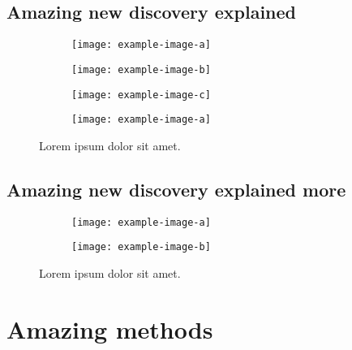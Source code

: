 \documentclass[10pt,a4paper]{article}
\begin{document}
\subsection{Amazing new discovery explained}
\label{sec:new_discovery_explained}
% 
\lipsum[7]

\begin{figure}[htb]
    \centering
    \begin{subfigure}{0.24\textwidth}
        \centering
        \texttt{[image: example-image-a]}
    \end{subfigure}
    \begin{subfigure}{0.24\textwidth}
        \centering
        \texttt{[image: example-image-b]}
    \end{subfigure}
    \begin{subfigure}{0.24\textwidth}
        \centering
        \texttt{[image: example-image-c]}
    \end{subfigure}
    \begin{subfigure}{0.24\textwidth}
        \centering
        \texttt{[image: example-image-a]}
    \end{subfigure}
    \caption{
        Lorem ipsum dolor sit amet.
    }
\end{figure}


\subsection{Amazing new discovery explained more}
\label{sec:new_discovery_explained_more}
% 

\begin{figure}[htb]
    \centering
    \begin{subfigure}{0.3\textwidth}
        \centering
        \texttt{[image: example-image-a]}
    \end{subfigure}
    \begin{subfigure}{0.3\textwidth}
        \centering
        \texttt{[image: example-image-b]}
    \end{subfigure}
    \caption{
        Lorem ipsum dolor sit amet.
    }
\end{figure}


\section{Amazing methods}
\label{sec:methods}
% 
\end{document}
